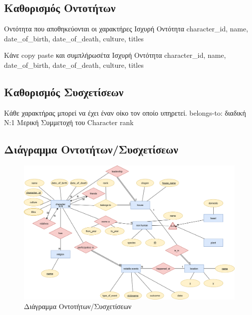 \documentclass[../main.tex]{subfiles}
\begin{document}
\subsection{Καθορισμός Οντοτήτων}

{Οντότητα που αποθηκεύονται οι χαρακτήρες}
{Ισχυρή Οντότητα}
{character\_id, name, date\_of\_birth, date\_of\_death, culture, titles}

{Κάνε copy paste και συμπλήρωσέτα}
{Ισχυρή Οντότητα}
{character\_id, name, date\_of\_birth, date\_of\_death, culture, titles}



\subsection{Καθορισμός Συσχετίσεων}

{Κάθε χαρακτήρας μπορεί να έχει έναν οίκο τον οποίο υπηρετεί.}
{belongs-to: διαδική}
{N:1}
{Μερική Συμμετοχή του Character}
{rank}


\subsection{Διάγραμμα Οντοτήτων/Συσχετίσεων}

\begin{figure}[H]
	\includegraphics[width=\textwidth]{../images/entity_relation_diagram.png}
	\caption{Διάγραμμα Οντοτήτων/Συσχετίσεων}
\end{figure}
\end{document}
